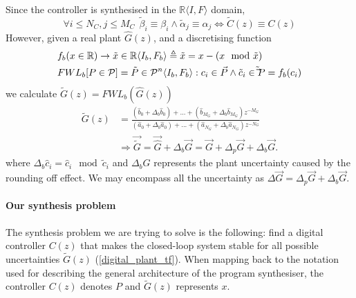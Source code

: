 \documentclass{sig-alternate-05-2015}
\begin{document}
Since the controller is synthesised in the $\mathbb{R}\langle I,F \rangle$
domain,
%
 $$\forall i \leq N_C, j \leq M_C\ \  \tilde \beta_{i} \equiv \beta_{i} \wedge \tilde \alpha_{j} \equiv \alpha_{j} \Leftrightarrow \tilde C(z) \equiv C(z)$$
%
However, given a real plant $\hat{G}(z)$, and a discretising function
\begin{align}
\small
\label{FWL_tf}
&f_b (x \in \mathbb{R}) \rightarrow \tilde x \in \mathbb{R}\langle I_b,F_b \rangle \triangleq \tilde x = x-(x\mod\tilde x) \\
&FWL_b[P \in \mathcal{P}] = \tilde P \in \mathcal{P}^{n}\langle I_b,F_b \rangle : c_i \in \vec{P} \wedge \tilde c_i \in \tilde \vec{P}=f_b(c_i)  \nonumber
\end{align}
we calculate $\tilde G(z)=FWL_b(\hat{G}(z))$
\begin{align}
\label{digital_plant_tf}
\tilde G(z)&=\frac{(\hat{b}_{0}+\Delta_b \hat{b}_{0}) +...+(\hat{b}_{M_G}+\Delta_b \hat{b}_{M_G})z^{-M_G}}{(\hat{a}_{0}+\Delta_b \hat{a}_{0})+...+(\hat{a}_{N_G}+\Delta_b \hat{a}_{N_G})z^{-N_G}} \nonumber \\
&\Rightarrow \vec{\tilde G} =\vec{\hat{G}}+\Delta_b{\vec{G}}=\vec{G}+\Delta_p{\vec{G}}+\Delta_b{\vec{G}}.
\end{align}
where $\Delta_b\hat{c}_i=\hat{c}_i\mod \tilde{c}_i$
and $\Delta_b{G}$ represents the plant uncertainty caused by
the rounding off effect.  We may encompass all the uncertainty as
$\Delta{\vec{G}}=\Delta_p{\vec{G}}+\Delta_b{\vec{G}}$.  %

\paragraph{Our synthesis problem}
The synthesis problem we are trying to solve is the following:
find a digital controller $C(z)$ %
that makes the closed-loop system stable 
for all possible uncertainties 
$\tilde G(z)$ (\ref{digital_plant_tf}).
When mapping back to the notation used for describing the general architecture 
of the program synthesiser, the controller $C(z)$ denotes $P$ and 
$\tilde G(z)$ represents $x$. 
\end{document}
